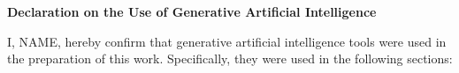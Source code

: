 


\def\name{NAME}
\def\place{PLACE}
\def\dateformat{1} %



\def\monthname{
  \ifcase\month
    \or January
    \or February
    \or March
    \or April
    \or May
    \or June
    \or July
    \or August
    \or September
    \or October
    \or November
    \or December
  \fi
}

\def\daysuffix{
  \ifcase\day
  \or st 
  \or nd 
  \or rd 
  \or th 
  \or th 
  \or th 
  \or th 
  \or th 
  \or th 
  \or th 
  \or th 
  \or th 
  \or th 
  \or th 
  \or th 
  \or th 
  \or th 
  \or th 
  \or th 
  \or th 
  \or st 
  \or nd 
  \or rd 
  \or th 
  \or th 
  \or th 
  \or th 
  \or th 
  \or th 
  \or th 
  \or st 
  \fi
}

\def\specdate{
  \ifcase\dateformat
     {\leavevmode\hbox{\monthname\,\the\day,\,\the\year}}
    \or {\leavevmode\hbox{\monthname\,\the\day,\,\the\year}}
    \or {\leavevmode\hbox{\the\day\textsuperscript{\daysuffix}\,\monthname,\,\the\year}}
    \or {\leavevmode\hbox{\monthname,\,\the\year}}
  \fi
}

\newpage
\thispagestyle{empty}
\sffamily
\hspace{0pt}
\vfill
\begin{center}
\bfseries \large Declaration on the Use of Generative Artificial Intelligence
\end{center}\vspace{3mm}

\noindent I, \name, hereby confirm
that generative artificial intelligence tools were used in the preparation of this work. Specifically, they were used in the following sections:

